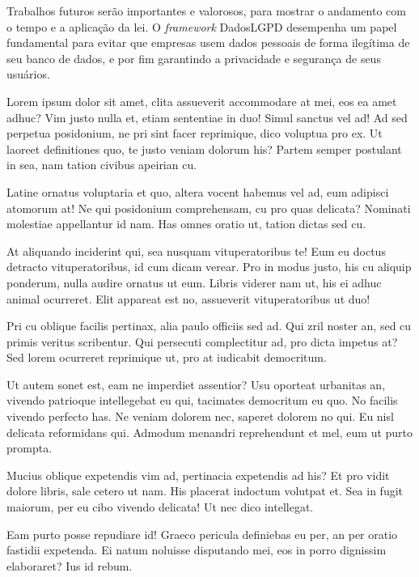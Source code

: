 \documentclass[
	12pt,				%
	openright,			%
	oneside,			%
	a4paper,			%
	english,			%
	french,				%
	spanish,			%
	brazil,				%
	]{abntex2}
\begin{document}
Trabalhos futuros serão importantes e valorosos, para mostrar o andamento com o tempo e a aplicação da lei. O \textit{\textit{framework} } DadosLGPD desempenha um papel fundamental para evitar que empresas usem dados pessoais de forma ilegítima de seu banco de dados, e por fim garantindo a privacidade e segurança de seus usuários.


Lorem ipsum dolor sit amet, clita assueverit accommodare at mei, eos ea amet adhuc? Vim justo nulla et, etiam sententiae in duo! Simul sanctus vel ad! Ad sed perpetua posidonium, ne pri sint facer reprimique, dico voluptua pro ex. Ut laoreet definitiones quo, te justo veniam dolorum his? Partem semper postulant in sea, nam tation civibus apeirian cu.

Latine ornatus voluptaria et quo, altera vocent habemus vel ad, eum adipisci atomorum at! Ne qui posidonium comprehensam, cu pro quas delicata? Nominati molestiae appellantur id nam. Has omnes oratio ut, tation dictas sed cu.

At aliquando inciderint qui, sea nusquam vituperatoribus te! Eum eu doctus detracto vituperatoribus, id cum dicam verear. Pro in modus justo, his cu aliquip ponderum, nulla audire ornatus ut eum. Libris viderer nam ut, his ei adhuc animal ocurreret. Elit appareat est no, assueverit vituperatoribus ut duo!

Pri cu oblique facilis pertinax, alia paulo officiis sed ad. Qui zril noster an, sed cu primis veritus scribentur. Qui persecuti complectitur ad, pro dicta impetus at? Sed lorem ocurreret reprimique ut, pro at iudicabit democritum.

Ut autem sonet est, eam ne imperdiet assentior? Usu oporteat urbanitas an, vivendo patrioque intellegebat eu qui, tacimates democritum eu quo. No facilis vivendo perfecto has. Ne veniam dolorem nec, saperet dolorem no qui. Eu nisl delicata reformidans qui. Admodum menandri reprehendunt et mel, eum ut purto prompta.

Mucius oblique expetendis vim ad, pertinacia expetendis ad his? Et pro vidit dolore libris, sale cetero ut nam. His placerat indoctum volutpat et. Sea in fugit maiorum, per eu cibo vivendo delicata! Ut nec dico intellegat.



Eam purto posse repudiare id! Graeco pericula definiebas eu per, an per oratio fastidii expetenda. Ei natum noluisse disputando mei, eos in porro dignissim elaboraret? Ius id rebum.

\end{document}
